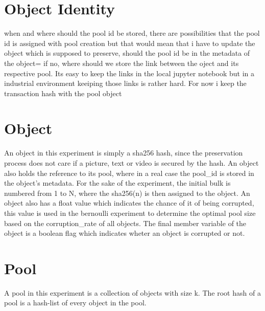 \section{Object Identity}
when and where should the pool id be stored, there are possibilities that the pool id is assigned with pool creation but that would mean that i have to update the object which is supposed to preserve, should the pool id be in the metadata of the object= if no, where should we store the link between the oject and its respective pool. Its easy to keep the links in the local jupyter notebook but in a industrial environment keeiping those links is rather hard. For now i keep the transaction hash with the pool object
\section{Object}
An object in this experiment is simply a sha256 hash, since the preservation process does not care if a picture, text or video is secured by the hash. An object also holds the reference to its pool, where in a real case the pool_id is stored in the object's metadata. For the sake of the experiment, the initial bulk is numbered from 1 to N, where the sha256(n) is then assigned to the object. An object also has a float value which indicates the chance of it of being corrupted, this value is used in the bernoulli experiment to determine the optimal pool size based on the corruption_rate of all objects. The final member variable of the object is a boolean flag which indicates wheter an object is corrupted or not.

\section{Pool}
A pool in this experiment is a collection of objects with size k. The root hash of a pool is a hash-list of every object in the pool.
